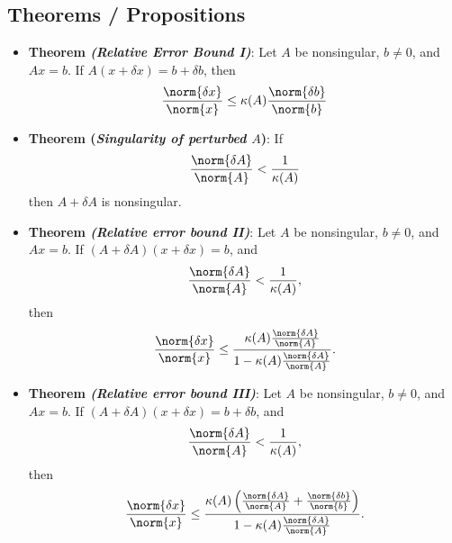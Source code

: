 \documentclass{report}
\begin{document}
    \bigbreak \noindent 
    \subsection{Theorems / Propositions}
    \begin{itemize}
        \item \textbf{Theorem \textit{(Relative Error Bound I)}}: Let $A$ be nonsingular, $b \ne 0$, and $Ax = b$. If $A(x + \delta  x) = b + \delta  b$, then
            \begin{align*}
                \frac{\norm{ \delta  x}}{\norm{ x}} \leq \kappa(A) \frac{\norm{\delta  b }}{\norm{ b}}
            \end{align*}
        \item \textbf{Theorem (\textit{Singularity of perturbed $A$})}: If
            \begin{align*}
                \frac{\norm{\delta A}}{\norm{A}} < \frac{1}{\kappa(A)}
            \end{align*}
            then $A + \delta  A$ is nonsingular.
        \item \textbf{Theorem \textit{(Relative error bound II)}}: Let $A$ be nonsingular, $b\ne 0$, and $Ax=b$. If $(A + \delta A)(x + \delta x) = b$, and 
            \begin{align*}
                \frac{\norm{\delta  A}}{\norm{A}} < \frac{1}{\kappa(A)},
            \end{align*}
            then
            \begin{align*}
                \frac{\norm{\delta x}}{\norm{x}} \leq \frac{\kappa(A)\frac{\norm{\delta A}}{\norm{A}}}{1-\kappa(A)\frac{\norm{\delta A}}{\norm{A}}}
            .\end{align*}
        \item \textbf{Theorem \textit{(Relative error bound III)}}:  Let $A$ be nonsingular, $b\ne 0$, and $Ax=b$. If $(A + \delta A)(x + \delta x) = b + \delta  b$, and 
            \begin{align*}
                \frac{\norm{\delta  A}}{\norm{A}} < \frac{1}{\kappa(A)},
            \end{align*}
            then
            \begin{align*}
                \frac{\norm{\delta x}}{\norm{x}} \leq \frac{\kappa(A)\left(\frac{\norm{\delta A}}{\norm{A}} + \frac{\norm{\delta b}}{\norm{b}}\right)}{1-\kappa(A)\frac{\norm{\delta A}}{\norm{A}}}
            .\end{align*}

    \end{itemize}
\end{document}
